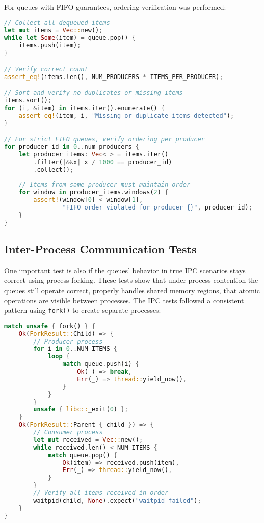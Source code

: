 For queues with FIFO guarantees, ordering verification was performed:

\begin{lstlisting}[language=Rust, style=boxed, caption={FIFO ordering verification under stress}, label={lst:fifo-stress-test}]
// Collect all dequeued items
let mut items = Vec::new();
while let Some(item) = queue.pop() {
    items.push(item);
}

// Verify correct count
assert_eq!(items.len(), NUM_PRODUCERS * ITEMS_PER_PRODUCER);

// Sort and verify no duplicates or missing items
items.sort();
for (i, &item) in items.iter().enumerate() {
    assert_eq!(item, i, "Missing or duplicate items detected");
}

// For strict FIFO queues, verify ordering per producer
for producer_id in 0..num_producers {
    let producer_items: Vec<_> = items.iter()
        .filter(|&&x| x / 1000 == producer_id)
        .collect();
    
    // Items from same producer must maintain order
    for window in producer_items.windows(2) {
        assert!(window[0] < window[1], 
                "FIFO order violated for producer {}", producer_id);
    }
}
\end{lstlisting}

\subsection{Inter-Process Communication Tests}
One important test is also if the queues' behavior in true \ac{IPC} scenarios stays correct using process forking. These tests show that under process contention the queues still operate correct, properly handles shared memory regions, that atomic operations are visible between processes. The \ac{IPC} tests followed a consistent pattern using \texttt{fork()} to create separate processes:

\begin{lstlisting}[language=Rust, style=boxed, caption={IPC test structure}, label={lst:ipc-test}]
match unsafe { fork() } {
    Ok(ForkResult::Child) => {
        // Producer process
        for i in 0..NUM_ITEMS {
            loop {
                match queue.push(i) {
                    Ok(_) => break,
                    Err(_) => thread::yield_now(),
                }
            }
        }
        unsafe { libc::_exit(0) };
    }
    Ok(ForkResult::Parent { child }) => {
        // Consumer process
        let mut received = Vec::new();
        while received.len() < NUM_ITEMS {
            match queue.pop() {
                Ok(item) => received.push(item),
                Err(_) => thread::yield_now(),
            }
        }
        // Verify all items received in order
        waitpid(child, None).expect("waitpid failed");
    }
}
\end{lstlisting}

